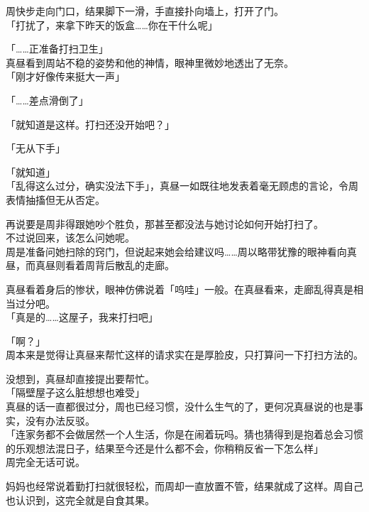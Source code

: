 周快步走向门口，结果脚下一滑，手直接扑向墙上，打开了门。\\

「打扰了，来拿下昨天的饭盒……你在干什么呢」

「……正准备打扫卫生」\\

真昼看到周站不稳的姿势和他的神情，眼神里微妙地透出了无奈。\\

「刚才好像传来挺大一声」

「……差点滑倒了」

「就知道是这样。打扫还没开始吧？」

「无从下手」

「就知道」\\

「乱得这么过分，确实没法下手」，真昼一如既往地发表着毫无顾虑的言论，令周表情抽搐但无从否定。

再说要是周非得跟她吵个胜负，那甚至都没法与她讨论如何开始打扫了。\\

不过说回来，该怎么问她呢。\\

周是准备问她扫除的窍门，但说起来她会给建议吗……周以略带犹豫的眼神看向真昼，而真昼则看着周背后散乱的走廊。

真昼看着身后的惨状，眼神仿佛说着「呜哇」一般。在真昼看来，走廊乱得真是相当过分吧。\\

「真是的……这屋子，我来打扫吧」

「啊？」\\

周本来是觉得让真昼来帮忙这样的请求实在是厚脸皮，只打算问一下打扫方法的。

没想到，真昼却直接提出要帮忙。\\

「隔壁屋子这么脏想想也难受」\\

真昼的话一直都很过分，周也已经习惯，没什么生气的了，更何况真昼说的也是事实，没有办法反驳。\\

「连家务都不会做居然一个人生活，你是在闹着玩吗。猜也猜得到是抱着总会习惯的乐观想法混日子，结果至今还是什么都不会，你稍稍反省一下怎么样」\\

周完全无话可说。

妈妈也经常说着勤打扫就很轻松，而周却一直放置不管，结果就成了这样。周自己也认识到，这完全就是自食其果。\\

